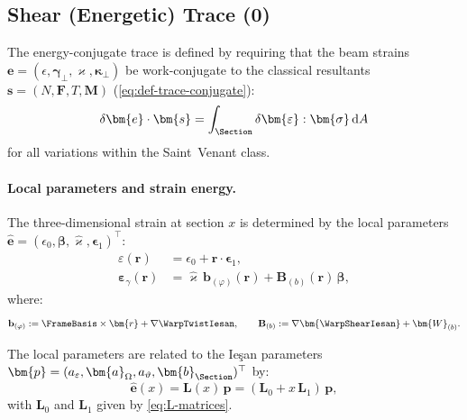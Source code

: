 \subsection{Shear (Energetic) Trace (0)}%

The energy-conjugate trace is defined by requiring that the beam strains 
$\bm{e} = (\epsilon, \bm{\gamma}_\perp, \varkappa, \bm{\kappa}_\perp)$ 
be work-conjugate to the classical resultants 
$\bm{s} = (N, \bm{F}, T, \bm{M})$
(\eqref{eq:def-trace-conjugate}):
\begin{equation*}
\delta\bm{e}\cdot \bm{s} = \int_\Section \delta\bm{\varepsilon} : \bm{\sigma} \, \mathrm{d}A
\end{equation*}
for all variations within the Saint~Venant class.

\paragraph{Local parameters and strain energy.}

The three-dimensional strain at section $x$ is determined by the local 
parameters $\hat{\bm{e}} = (\epsilon_0, \bm{\beta}, \hat{\varkappa}, \bm{\epsilon}_1)^\top$:
\begin{align}
\varepsilon(\bm{r}) &= \epsilon_0 + \bm{r} \cdot \bm{\epsilon}_1, \\
\bm{\varepsilon}_\gamma(\bm{r}) &= \hat{\varkappa}\,\mathbf{b}_{(\varphi)}(\bm{r}) + \mathbf{B}_{(b)}(\bm{r})\,\bm{\beta},
\end{align}
where:
\begin{equation}
\mathbf{b}_{(\varphi)} := \FrameBasis \times \bm{r} + \nabla\WarpTwistIesan, \qquad 
\mathbf{B}_{(b)} := \nabla\bm{\WarpShearIesan} + \bm{W}_{(b)}.
\end{equation}

The local parameters are related to the Ieşan parameters 
$\bm{p} = (a_\varepsilon, \bm{a}_\Omega, a_\vartheta, \bm{b}_{\Section})^\top$ by:
\begin{equation}
\hat{\bm{e}}(x) = \mathbf{L}(x)\,\bm{p} = (\mathbf{L}_0 + x\,\mathbf{L}_1)\,\bm{p},
\end{equation}
with $\mathbf{L}_0$ and \(\mathbf{L}_1\) given by \eqref{eq:L-matrices}.

